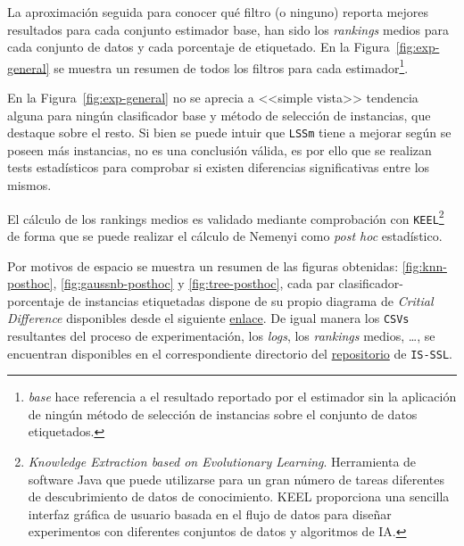 La aproximación seguida para conocer qué filtro (o ninguno) reporta mejores resultados para cada conjunto estimador base, han sido los \textit{rankings} medios para cada conjunto de datos y cada porcentaje de etiquetado. En la Figura~\ref{fig:exp-general} se muestra un resumen de todos los filtros para cada estimador\footnote{\emph{base} hace referencia a el resultado reportado por el estimador sin la aplicación de ningún método de selección de instancias sobre el conjunto de datos etiquetados.}. 


En la Figura~\ref{fig:exp-general} no se aprecia a <<simple vista>> tendencia alguna para ningún clasificador base y método de selección de instancias, que destaque sobre el resto. Si bien se puede intuir que \texttt{LSSm} tiene a mejorar según se poseen más instancias, no es una conclusión válida, es por ello que se realizan tests estadísticos para comprobar si existen diferencias significativas entre los mismos.

El cálculo de los rankings medios es validado mediante comprobación con \texttt{KEEL}\footnote{\textit{Knowledge Extraction based on Evolutionary Learning}. Herramienta de software Java que puede utilizarse para un gran número de tareas diferentes de descubrimiento de datos de conocimiento. KEEL proporciona una sencilla interfaz gráfica de usuario basada en el flujo de datos para diseñar experimentos con diferentes conjuntos de datos y algoritmos de IA.}~\cite{alcala2009keel, alcala2011keel} de forma que se puede realizar el cálculo de Nemenyi como \textit{post hoc} estadístico. 

Por motivos de espacio se muestra un resumen de las figuras obtenidas: \ref{fig:knn-posthoc}, \ref{fig:gaussnb-posthoc} y \ref{fig:tree-posthoc},  cada par clasificador-porcentaje de instancias etiquetadas dispone de su propio diagrama de \emph{Critial Difference} disponibles desde el siguiente \href{dd}{enlace}. De igual manera los \texttt{CSVs} resultantes del proceso de experimentación, los \textit{logs}, los \textit{rankings} medios, \dots, se encuentran disponibles en el correspondiente directorio del \href{https://github.com/dpr1005/Semisupervised-learning-and-instance-selection-methods/tree/main/experimentation}{repositorio} de \texttt{IS-SSL}.


